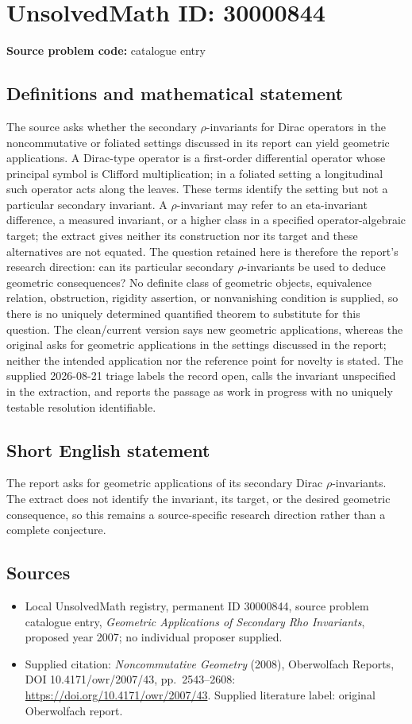 \documentclass[11pt]{article}
\begin{document}
\section*{UnsolvedMath ID: 30000844}
\textbf{Source problem code:} catalogue entry
\subsection{Definitions and mathematical statement}
The source asks whether the secondary $\rho$-invariants for Dirac operators in the noncommutative or foliated settings discussed in its report can yield geometric applications. A Dirac-type operator is a first-order differential operator whose principal symbol is Clifford multiplication; in a foliated setting a longitudinal such operator acts along the leaves. These terms identify the setting but not a particular secondary invariant. A $\rho$-invariant may refer to an eta-invariant difference, a measured invariant, or a higher class in a specified operator-algebraic target; the extract gives neither its construction nor its target and these alternatives are not equated. The question retained here is therefore the report's research direction: can its particular secondary $\rho$-invariants be used to deduce geometric consequences? No definite class of geometric objects, equivalence relation, obstruction, rigidity assertion, or nonvanishing condition is supplied, so there is no uniquely determined quantified theorem to substitute for this question. The clean/current version says new geometric applications, whereas the original asks for geometric applications in the settings discussed in the report; neither the intended application nor the reference point for novelty is stated. The supplied 2026-08-21 triage labels the record open, calls the invariant unspecified in the extraction, and reports the passage as work in progress with no uniquely testable resolution identifiable.
\subsection{Short English statement}
The report asks for geometric applications of its secondary Dirac $\rho$-invariants. The extract does not identify the invariant, its target, or the desired geometric consequence, so this remains a source-specific research direction rather than a complete conjecture.
\subsection{Sources}
\begin{itemize}\item Local UnsolvedMath registry, permanent ID 30000844, source problem catalogue entry, \emph{Geometric Applications of Secondary Rho Invariants}, proposed year 2007; no individual proposer supplied.\item Supplied citation: \emph{Noncommutative Geometry} (2008), Oberwolfach Reports, DOI 10.4171/owr/2007/43, pp.\ 2543--2608: \url{https://doi.org/10.4171/owr/2007/43}. Supplied literature label: original Oberwolfach report.\end{itemize}
\end{document}
